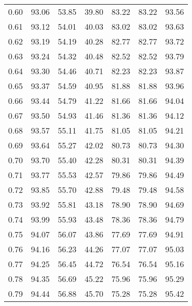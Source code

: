 \begin{tabular}{|c|c|c|c|c|c|c|}
      0.60 &     93.06 &     53.85 &      39.80 &   83.22 &      83.22 &         93.56 \\
      0.61 &     93.12 &     54.01 &      40.03 &   83.02 &      83.02 &         93.63 \\
      0.62 &     93.19 &     54.19 &      40.28 &   82.77 &      82.77 &         93.72 \\
      0.63 &     93.24 &     54.32 &      40.48 &   82.52 &      82.52 &         93.79 \\
      0.64 &     93.30 &     54.46 &      40.71 &   82.23 &      82.23 &         93.87 \\
      0.65 &     93.37 &     54.59 &      40.95 &   81.88 &      81.88 &         93.96 \\
      0.66 &     93.44 &     54.79 &      41.22 &   81.66 &      81.66 &         94.04 \\
      0.67 &     93.50 &     54.93 &      41.46 &   81.36 &      81.36 &         94.12 \\
      0.68 &     93.57 &     55.11 &      41.75 &   81.05 &      81.05 &         94.21 \\
      0.69 &     93.64 &     55.27 &      42.02 &   80.73 &      80.73 &         94.30 \\
      0.70 &     93.70 &     55.40 &      42.28 &   80.31 &      80.31 &         94.39 \\
      0.71 &     93.77 &     55.53 &      42.57 &   79.86 &      79.86 &         94.49 \\
      0.72 &     93.85 &     55.70 &      42.88 &   79.48 &      79.48 &         94.58 \\
      0.73 &     93.92 &     55.81 &      43.18 &   78.90 &      78.90 &         94.69 \\
      0.74 &     93.99 &     55.93 &      43.48 &   78.36 &      78.36 &         94.79 \\
      0.75 &     94.07 &     56.07 &      43.86 &   77.69 &      77.69 &         94.91 \\
      0.76 &     94.16 &     56.23 &      44.26 &   77.07 &      77.07 &         95.03 \\
      0.77 &     94.25 &     56.45 &      44.72 &   76.54 &      76.54 &         95.16 \\
      0.78 &     94.35 &     56.69 &      45.22 &   75.96 &      75.96 &         95.29 \\
      0.79 &     94.44 &     56.88 &      45.70 &   75.28 &      75.28 &         95.42 \\

\end{tabular}
